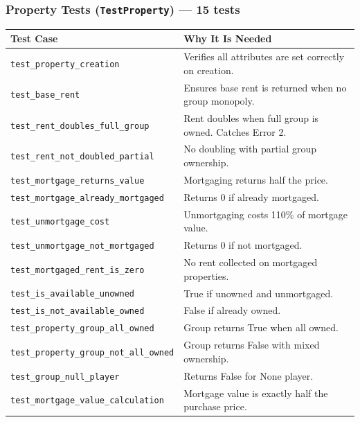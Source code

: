 \documentclass[12pt,a4paper]{article}
\begin{document}
\subsubsection{Property Tests (\texttt{TestProperty}) --- 15 tests}
\begin{longtable}{p{5.8cm} p{6.2cm}}
\toprule
\textbf{Test Case} & \textbf{Why It Is Needed} \\
\midrule
\texttt{test\_property\_creation} & Verifies all attributes are set correctly on creation. \\
\texttt{test\_base\_rent} & Ensures base rent is returned when no group monopoly. \\
\texttt{test\_rent\_doubles\_full\_group} & Rent doubles when full group is owned. Catches Error 2. \\
\texttt{test\_rent\_not\_doubled\_partial} & No doubling with partial group ownership. \\
\texttt{test\_mortgage\_returns\_value} & Mortgaging returns half the price. \\
\texttt{test\_mortgage\_already\_mortgaged} & Returns 0 if already mortgaged. \\
\texttt{test\_unmortgage\_cost} & Unmortgaging costs 110\% of mortgage value. \\
\texttt{test\_unmortgage\_not\_mortgaged} & Returns 0 if not mortgaged. \\
\texttt{test\_mortgaged\_rent\_is\_zero} & No rent collected on mortgaged properties. \\
\texttt{test\_is\_available\_unowned} & True if unowned and unmortgaged. \\
\texttt{test\_is\_not\_available\_owned} & False if already owned. \\
\texttt{test\_property\_group\_all\_owned} & Group returns True when all owned. \\
\texttt{test\_property\_group\_not\_all\_owned} & Group returns False with mixed ownership. \\
\texttt{test\_group\_null\_player} & Returns False for None player. \\
\texttt{test\_mortgage\_value\_calculation} & Mortgage value is exactly half the purchase price. \\
\bottomrule
\end{longtable}
\end{document}
